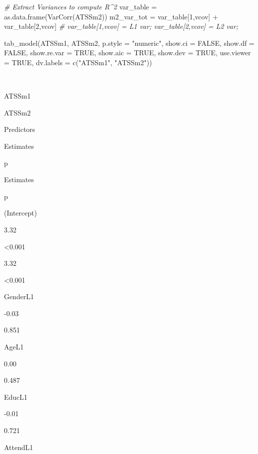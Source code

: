 \documentclass[
  english,
]{book}
\newenvironment{Shaded}{\begin{snugshade}}{\end{snugshade}}
\newcommand{\AttributeTok}[1]{\textcolor[rgb]{0.77,0.63,0.00}{#1}}
\newcommand{\CommentTok}[1]{\textcolor[rgb]{0.56,0.35,0.01}{\textit{#1}}}
\newcommand{\ConstantTok}[1]{\textcolor[rgb]{0.00,0.00,0.00}{#1}}
\newcommand{\DecValTok}[1]{\textcolor[rgb]{0.00,0.00,0.81}{#1}}
\newcommand{\FunctionTok}[1]{\textcolor[rgb]{0.00,0.00,0.00}{#1}}
\newcommand{\NormalTok}[1]{#1}
\newcommand{\OtherTok}[1]{\textcolor[rgb]{0.56,0.35,0.01}{#1}}
\newcommand{\SpecialCharTok}[1]{\textcolor[rgb]{0.00,0.00,0.00}{#1}}
\newcommand{\StringTok}[1]{\textcolor[rgb]{0.31,0.60,0.02}{#1}}
\begin{document}
\begin{Shaded}
\begin{Highlighting}[]
\CommentTok{\# Extract Variances to compute R\^{}2}
\NormalTok{  var\_table }\OtherTok{=} \FunctionTok{as.data.frame}\NormalTok{(}\FunctionTok{VarCorr}\NormalTok{(ATSSm2))}
\NormalTok{  m2\_var\_tot }\OtherTok{=}\NormalTok{ var\_table[}\DecValTok{1}\NormalTok{,}\StringTok{\textquotesingle{}vcov\textquotesingle{}}\NormalTok{] }\SpecialCharTok{+}\NormalTok{ var\_table[}\DecValTok{2}\NormalTok{,}\StringTok{\textquotesingle{}vcov\textquotesingle{}}\NormalTok{] }\CommentTok{\# var\_table[1,\textquotesingle{}vcov\textquotesingle{}] = L1 var; var\_table[2,\textquotesingle{}vcov\textquotesingle{}] = L2 var; }

\FunctionTok{tab\_model}\NormalTok{(ATSSm1, ATSSm2, }\AttributeTok{p.style =} \StringTok{"numeric"}\NormalTok{, }\AttributeTok{show.ci =} \ConstantTok{FALSE}\NormalTok{, }\AttributeTok{show.df =} \ConstantTok{FALSE}\NormalTok{, }\AttributeTok{show.re.var =} \ConstantTok{TRUE}\NormalTok{, }\AttributeTok{show.aic =} \ConstantTok{TRUE}\NormalTok{, }\AttributeTok{show.dev =} \ConstantTok{TRUE}\NormalTok{, }\AttributeTok{use.viewer =} \ConstantTok{TRUE}\NormalTok{, }\AttributeTok{dv.labels =} \FunctionTok{c}\NormalTok{(}\StringTok{"ATSSm1"}\NormalTok{, }\StringTok{"ATSSm2"}\NormalTok{))}
\end{Highlighting}
\end{Shaded}

~

ATSSm1

ATSSm2

Predictors

Estimates

p

Estimates

p

(Intercept)

3.32

\textless0.001

3.32

\textless0.001

GenderL1

-0.03

0.851

AgeL1

0.00

0.487

EducL1

-0.01

0.721

AttendL1
\end{document}
